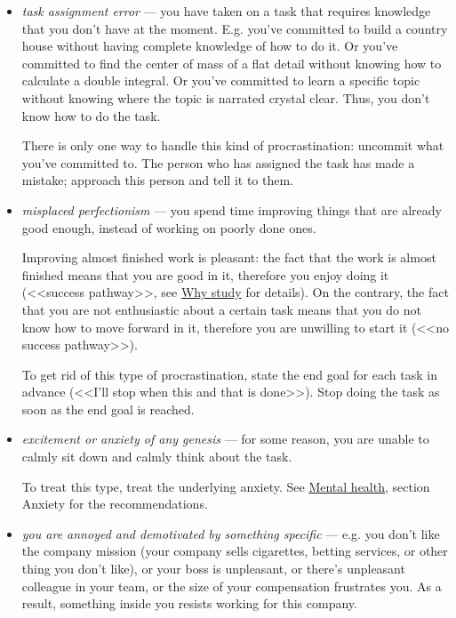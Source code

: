 \documentclass[11pt]{article}
\theoremstyle{remark}
\theoremstyle{definition}
\begin{document}
\begin{itemize}


\item \textit{task assignment error} --- you have taken on a task that requires knowledge that you don't have at the moment. E.g. you've committed to build a country house without having complete knowledge of how to do it. Or you've committed to find the center of mass of a flat detail without knowing how to calculate a double integral. Or you've committed to learn a specific topic without knowing where the topic is narrated crystal clear. Thus, you don't know how to do the task.

There is only one way to handle this kind of procrastination: uncommit what you've committed to. The person who has assigned the task has made a mistake; approach this person and tell it to them.





\item \textit{misplaced perfectionism} --- you spend time improving things that are already good enough, instead of working on poorly done ones.

Improving almost finished work is pleasant: the fact that the work is almost finished means that you are good in it, therefore you enjoy doing it (<<success pathway>>, see \href{https://garkoosha.org/misc/why_study.pdf}{Why study} for details). On the contrary, the fact that you are not enthusiastic about a certain task means that you do not know how to move forward in it, therefore you are unwilling to start it (<<no success pathway>>).

To get rid of this type of procrastination, state the end goal for each task in advance (<<I'll stop when this and that is done>>). Stop doing the task as soon as the end goal is reached.




\item \textit{excitement or anxiety of any genesis} --- for some reason, you are unable to calmly sit down and calmly think about the task. 

To treat this type, treat the underlying anxiety. See \href{https://garkoosha.org/misc/mental_health.pdf}{Mental health}, section Anxiety for the recommendations.



\item \textit{you are annoyed and demotivated by something specific} --- e.g. you don't like the company mission (your company sells cigarettes, betting services, or other thing you don't like), or your boss is unpleasant, or there's unpleasant colleague in your team, or the size of your compensation frustrates you. As a result, something inside you resists working for this company. 


\end{itemize}
\end{document}
